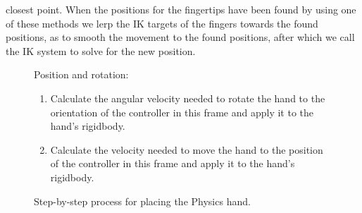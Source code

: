 closest point. When the positions for the fingertips have been found by using one of these methods we lerp the IK targets of the fingers towards the found positions, as to smooth the movement to the found positions, after which we call the IK system to solve for the new position.


\begin{figure}[H]
\centering
\small
\begin{flushleft}
Position and rotation:
\end{flushleft}
\begin{enumerate}[noitemsep]
\item Calculate the angular velocity needed to rotate the hand to the orientation of the controller in this frame and apply it to the hand's rigidbody.
\item Calculate the velocity needed to move the hand to the position of the controller in this frame and apply it to the hand's rigidbody.
\end{enumerate}
\caption{Step-by-step process for placing the Physics hand.}
\label{fig:stepByStepPhysicsHandPositionRotation}
\end{figure}

